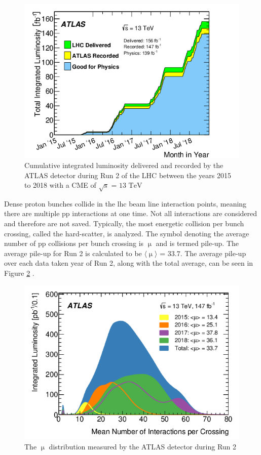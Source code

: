 \begin{figure}[h]
  \centering
  \includegraphics[scale=0.6]{figs/ch3/int_lumi.png}
  \caption{ Cumulative integrated luminosity delivered and recorded by the ATLAS detector during Run 2 of the 
  LHC between the years 2015 to 2018 with a CME of $\sqrt{\textrm{s}}$ = $\textrm{13 \ TeV}$}
\label{fig:3.2}
\end{figure}

Dense proton bunches collide in the \gls{lhc} beam line interaction points, meaning there are multiple \gls{pp} interactions at one time.
Not all interactions are considered and therefore are not saved. Typically, the most energetic collision per bunch crossing, called the hard-scatter,
is analyzed. The symbol denoting the average number of \gls{pp} collisions per bunch crossing is $\upmu$ and is termed pile-up.
The average pile-up for Run 2 is calculated to be $\langle \upmu \rangle$ = $\textrm{33.7}$. The average pile-up over each data taken year of Run 2, along with 
the total average, can be seen in Figure \ref{fig:3.3} \cite{lumi}.

\begin{figure}[h]
  \centering
  \includegraphics[scale=0.6]{figs/ch3/lumi_weight.png}
  \caption{ The $\upmu$ distribution measured by the ATLAS detector during Run 2 \cite{lumi}}
\label{fig:3.3}
\end{figure}

